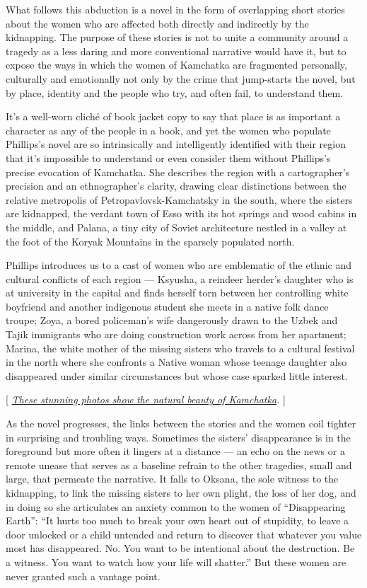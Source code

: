 What follows this abduction is a novel in the form of overlapping short
stories about the women who are affected both directly and indirectly by
the kidnapping. The purpose of these stories is not to unite a community
around a tragedy as a less daring and more conventional narrative would
have it, but to expose the ways in which the women of Kamchatka are
fragmented personally, culturally and emotionally not only by the crime
that jump-starts the novel, but by place, identity and the people who
try, and often fail, to understand them.

It's a well-worn cliché of book jacket copy to say that place is as
important a character as any of the people in a book, and yet the women
who populate Phillips's novel are so intrinsically and intelligently
identified with their region that it's impossible to understand or even
consider them without Phillips's precise evocation of Kamchatka. She
describes the region with a cartographer's precision and an
ethnographer's clarity, drawing clear distinctions between the relative
metropolis of Petropavlovsk-Kamchatsky in the south, where the sisters
are kidnapped, the verdant town of Esso with its hot springs and wood
cabins in the middle, and Palana, a tiny city of Soviet architecture
nestled in a valley at the foot of the Koryak Mountains in the sparsely
populated north.

Phillips introduces us to a cast of women who are emblematic of the
ethnic and cultural conflicts of each region --- Ksyusha, a reindeer
herder's daughter who is at university in the capital and finds herself
torn between her controlling white boyfriend and another indigenous
student she meets in a native folk dance troupe; Zoya, a bored
policeman's wife dangerously drawn to the Uzbek and Tajik immigrants who
are doing construction work across from her apartment; Marina, the white
mother of the missing sisters who travels to a cultural festival in the
north where she confronts a Native woman whose teenage daughter also
disappeared under similar circumstances but whose case sparked little
interest.

{[}
\href{https://www.nytimes3xbfgragh.onion/slideshow/2015/04/05/world/20150405-KAMCHATKA.html?searchResultPosition=1}{\emph{These
stunning photos show the natural beauty of Kamchatka}}\emph{.} {]}

As the novel progresses, the links between the stories and the women
coil tighter in surprising and troubling ways. Sometimes the sisters'
disappearance is in the foreground but more often it lingers at a
distance --- an echo on the news or a remote unease that serves as a
baseline refrain to the other tragedies, small and large, that permeate
the narrative. It falls to Oksana, the sole witness to the kidnapping,
to link the missing sisters to her own plight, the loss of her dog, and
in doing so she articulates an anxiety common to the women of
``Disappearing Earth'': ``It hurts too much to break your own heart out
of stupidity, to leave a door unlocked or a child untended and return to
discover that whatever you value most has disappeared. No. You want to
be intentional about the destruction. Be a witness. You want to watch
how your life will shatter.'' But these women are never granted such a
vantage point.

